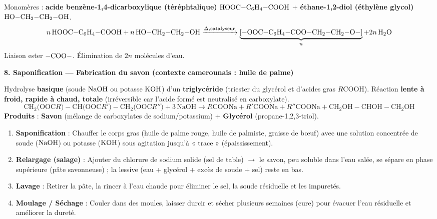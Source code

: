 \documentclass[11pt]{article}
\begin{document}
\begin{aretenir}
\begin{exemplebox}
Monomères : \textbf{acide benzène-1,4-dicarboxylique (téréphtalique)} $\ce{HOOC-C6H4-COOH}$ + \textbf{éthane-1,2-diol (éthylène glycol)} $\ce{HO-CH2-CH2-OH}$.
\[ n\,\ce{HOOC-C6H4-COOH} + n\,\ce{HO-CH2-CH2-OH} \xrightarrow{\Delta, \text{catalyseur}} \underbrace{\ce{[-OOC-C6H4-COO-CH2-CH2-O-]}}_n + 2n\,\ce{H2O} \]
Liaison ester $\ce{-COO-}$. Élimination de $2n$ molécules d'eau.
\end{exemplebox}

\textbf{8. Saponification — Fabrication du savon (contexte camerounais : huile de palme)}
\begin{definition}[Saponification]
Hydrolyse \textbf{basique} (soude $\ce{NaOH}$ ou potasse $\ce{KOH}$) d'un \textbf{triglycéride} (triester du glycérol et d'acides gras $R\mathrm{COOH}$). Réaction \textbf{lente à froid, rapide à chaud, totale} (irréversible car l'acide formé est neutralisé en carboxylate).
\[
\mathrm{CH_2(OOC}R)-\mathrm{CH(OOC}R')-\mathrm{CH_2(OOC}R'') + 3\,\mathrm{NaOH} \rightarrow
R\mathrm{COONa} + R'\mathrm{COONa} + R''\mathrm{COONa} + \mathrm{CH_2OH-CHOH-CH_2OH}
\]
\textbf{Produits} : \textbf{Savon} (mélange de carboxylates de sodium/potassium) + \textbf{Glycérol} (propane-1,2,3-triol).
\end{definition}

\begin{methode}
\begin{enumerate}
  \item \textbf{Saponification} : Chauffer le corps gras (huile de palme rouge, huile de palmiste, graisse de bœuf) avec une solution concentrée de soude ($\ce{NaOH}$) ou potasse ($\ce{KOH}$) sous agitation jusqu'à « trace » (épaississement).
  \item \textbf{Relargage (salage)} : Ajouter du chlorure de sodium solide (sel de table) $\rightarrow$ le savon, peu soluble dans l'eau salée, se sépare en phase supérieure (pâte savonneuse) ; la lessive (eau + glycérol + excès de soude + sel) reste en bas.
  \item \textbf{Lavage} : Retirer la pâte, la rincer à l'eau chaude pour éliminer le sel, la soude résiduelle et les impuretés.
  \item \textbf{Moulage / Séchage} : Couler dans des moules, laisser durcir et sécher plusieurs semaines (cure) pour évacuer l'eau résiduelle et améliorer la dureté.
\end{enumerate}
\end{methode}


\end{aretenir}
\end{document}
